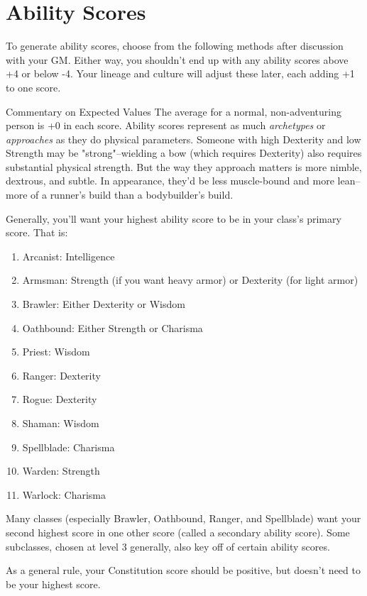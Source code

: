 \section{Ability Scores}
To generate ability scores, choose from the following methods after discussion with your GM. Either way, you shouldn't end up with any ability scores above +4 or below -4. Your lineage and culture will adjust these later, each adding +1 to one score.

\begin{DndComment}{Commentary on Expected Values}
	The average for a normal, non-adventuring person is +0 in each score. Ability scores represent as much \textit{archetypes} or \textit{approaches} as they do physical parameters. Someone with high Dexterity and low Strength may be "strong"--wielding a bow (which requires Dexterity) also requires substantial physical strength. But the way they approach matters is more nimble, dextrous, and subtle. In appearance, they'd be less muscle-bound and more lean--more of a runner's build than a bodybuilder's build.

	Generally, you'll want your highest ability score to be in your class's primary score. That is:
	\begin{enumerate}
		\item Arcanist: Intelligence
		\item Armsman: Strength (if you want heavy armor) or Dexterity (for light armor)
		\item Brawler: Either Dexterity or Wisdom
		\item Oathbound: Either Strength or Charisma
		\item Priest: Wisdom
		\item Ranger: Dexterity
		\item Rogue: Dexterity
		\item Shaman: Wisdom
		\item Spellblade: Charisma
		\item Warden: Strength
		\item Warlock: Charisma
	\end{enumerate}

	Many classes (especially Brawler, Oathbound, Ranger, and Spellblade) want your second highest score in one other score (called a secondary ability score). Some subclasses, chosen at level 3 generally, also key off of certain ability scores.

	As a general rule, your Constitution score should be positive, but doesn't need to be your highest score.
\end{DndComment}

